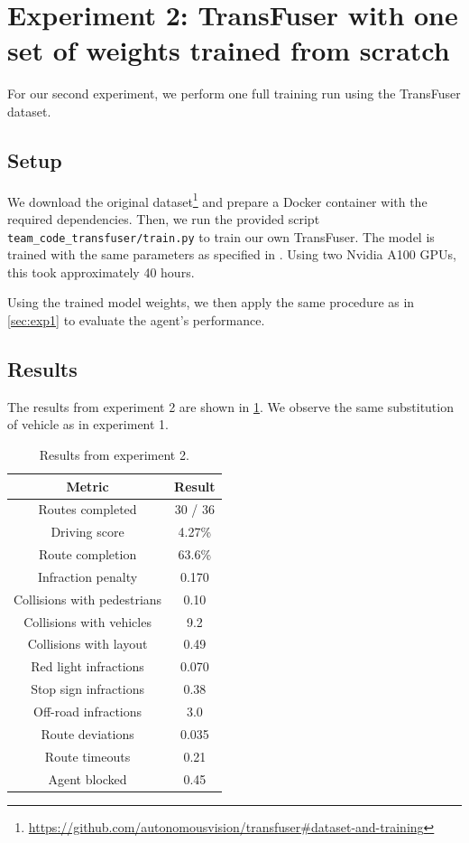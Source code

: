 
\section{Experiment 2: TransFuser with one set of weights trained from scratch}
\label{sec:exp2}
For our second experiment,
we perform one full training run using the TransFuser dataset.

\subsection{Setup}
We download the original dataset\footnote{\url{https://github.com/autonomousvision/transfuser\#dataset-and-training}} and prepare a Docker container with the required dependencies.
Then, we run the provided script \texttt{team\_code\_transfuser/train.py} to train our own TransFuser.
The model is trained with the same parameters as specified in \cite{transfuser-pami}.
Using two Nvidia A100 GPUs, this took approximately 40 hours.

Using the trained model weights,
we then apply the same procedure as in \cref{sec:exp1}
to evaluate the agent's performance.


\subsection{Results}

The results from experiment 2 are shown in \cref{tab:exp2:results}.
We observe the same substitution of vehicle as in experiment 1.

\begin{table}[]
    \centering
    \begin{tabular}{|c|c|}
        \hline
        \textbf{Metric} & \textbf{Result} \\ \hline
        Routes completed & 30 / 36 \\ \hline
        Driving score & 4.27\% \\ \hline
        Route completion & 63.6\% \\ \hline
        Infraction penalty & 0.170 \\ \hline
        Collisions with pedestrians & 0.10 \\ \hline
        Collisions with vehicles & 9.2 \\ \hline
        Collisions with layout & 0.49 \\ \hline
        Red light infractions & 0.070 \\ \hline
        Stop sign infractions & 0.38 \\ \hline
        Off-road infractions & 3.0 \\ \hline
        Route deviations & 0.035 \\ \hline
        Route timeouts & 0.21 \\ \hline
        Agent blocked & 0.45 \\ \hline
    \end{tabular}
    \caption{Results from experiment 2.}
    \label{tab:exp2:results}
\end{table}

